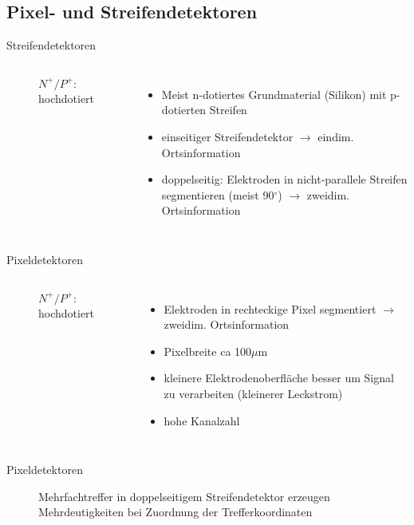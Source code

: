 \subsection[]{Pixel- und Streifendetektoren}


\begin{frame}{Streifendetektoren}
	\begin{columns}[T]
			\begin{figure}[htbp]
			  \centering
			   
			  \caption*{$N^+/P^+$: hochdotiert}
			\end{figure}
	    	\begin{itemize}
			  \item Meist n-dotiertes Grundmaterial (Silikon) mit p-dotierten Streifen
			  \item einseitiger Streifendetektor $\rightarrow$ eindim. Ortsinformation
			  \item doppelseitig: Elektroden in nicht-parallele Streifen segmentieren (meist 90$^\circ$)
			  $\rightarrow$ zweidim. Ortsinformation
			\end{itemize}
    \end{columns}
\end{frame}

\begin{frame}{Pixeldetektoren}
	\begin{columns}[T]
			\begin{figure}[htbp]
			  \centering
			  
			  \caption*{$N^+/P^+$: hochdotiert}
			\end{figure}	
	    	\begin{itemize}
			  \item Elektroden in rechteckige Pixel segmentiert $\rightarrow$ zweidim. Ortsinformation
			  \item Pixelbreite ca 100$\mu$m
			  \item kleinere Elektrodenoberfläche besser um Signal zu verarbeiten (kleinerer Leckstrom)
			  \item hohe Kanalzahl
			\end{itemize}
    \end{columns}
\end{frame}


\begin{frame}{Pixeldetektoren}
			\begin{figure}[htbp]
			  \centering
			  
			  \caption{Mehrfachtreffer in doppelseitigem Streifendetektor erzeugen Mehrdeutigkeiten bei Zuordnung
			der Trefferkoordinaten}
			\end{figure}
			 \vspace{1cm}
\end{frame}


